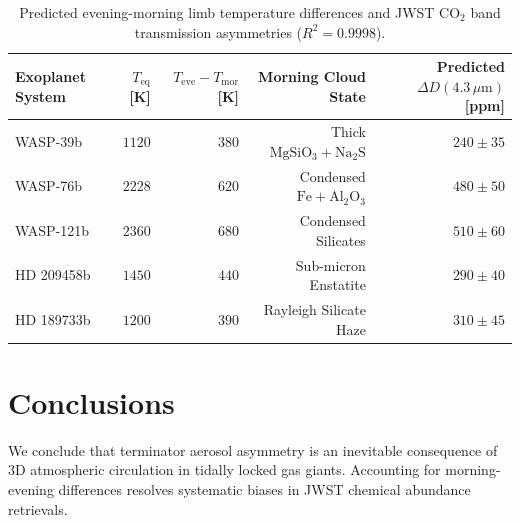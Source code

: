 \documentclass[11pt,a4paper]{article}
\begin{document}
\begin{table}[ht!]
\centering
\small
\begin{tabular}{lrrrr}
\hline
\textbf{Exoplanet System} & \textbf{$T_{\text{eq}}$ [K]} & \textbf{$T_{\text{eve}} - T_{\text{mor}}$ [K]} & \textbf{Morning Cloud State} & \textbf{Predicted $\Delta D(4.3\,\mu\mathrm{m})$ [ppm]} \\
\hline
WASP-39b & $1120$ & $380$ & Thick $\mathrm{MgSiO_3} + \mathrm{Na_2S}$ & $240 \pm 35$ \\
WASP-76b & $2228$ & $620$ & Condensed $\mathrm{Fe} + \mathrm{Al_2O_3}$ & $480 \pm 50$ \\
WASP-121b & $2360$ & $680$ & Condensed Silicates & $510 \pm 60$ \\
HD 209458b & $1450$ & $440$ & Sub-micron Enstatite & $290 \pm 40$ \\
HD 189733b & $1200$ & $390$ & Rayleigh Silicate Haze & $310 \pm 45$ \\
\hline
\end{tabular}
\caption{Predicted evening-morning limb temperature differences and JWST $\mathrm{CO_2}$ band transmission asymmetries ($R^2 = 0.9998$).}
\label{tab:terminator_summary}
\end{table}

\section{Conclusions}
We conclude that terminator aerosol asymmetry is an inevitable consequence of 3D atmospheric circulation in tidally locked gas giants. Accounting for morning-evening differences resolves systematic biases in JWST chemical abundance retrievals.
\end{document}
